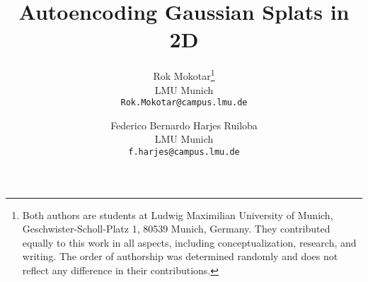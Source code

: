 \documentclass[10pt,twocolumn,letterpaper]{article}
\title{Autoencoding Gaussian Splats in 2D}
\author{Rok Mokotar\thanks{Both authors are students at Ludwig Maximilian University of Munich, Geschwister-Scholl-Platz 1, 80539 Munich, Germany. They contributed equally to this work in all aspects, including conceptualization, research, and writing. The order of authorship was determined randomly and does not reflect any difference in their contributions.}\\
LMU Munich\\
{\tt\small Rok.Mokotar@campus.lmu.de}
\and
Federico Bernardo Harjes Ruiloba\footnotemark[1]\\
LMU Munich\\
{\tt\small f.harjes@campus.lmu.de}
}
\begin{document}
\maketitle







{
    \small
    
    
}
\end{document}
